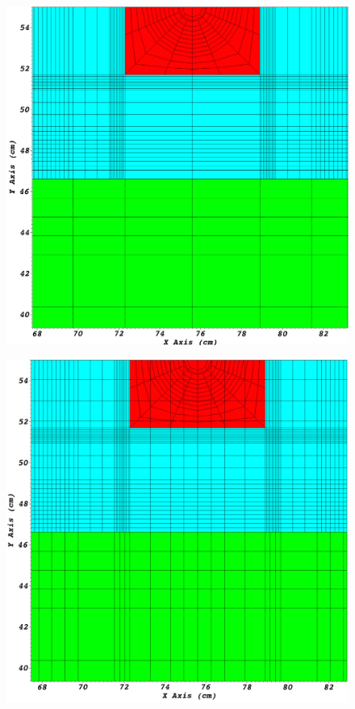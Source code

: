 \begin{figure}[H]
\centering
\includegraphics[scale=0.15]{../../figures/level2_nocut_zoom.png}
\label{level2_nocut_zoom}
\caption{}
\end{figure}

\begin{figure}[H]
\centering
\includegraphics[scale=0.15]{../../figures/level2_42x13_balanced_zoom.png}
\label{level2_42x13_balanced_zoom}
\caption{}
\end{figure}
